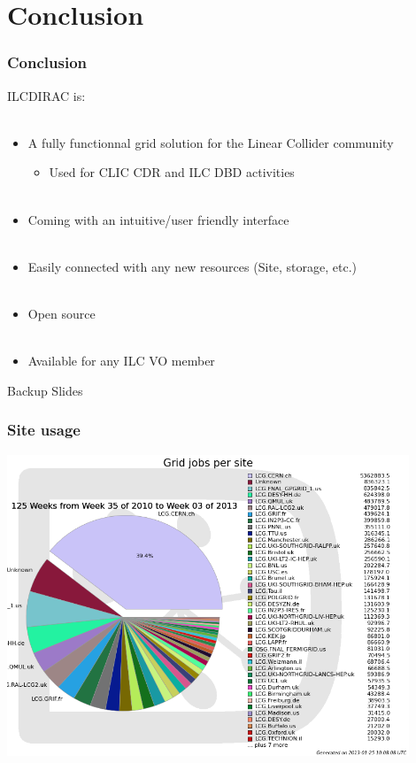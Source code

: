 \documentclass[10pt,table,dvipsnames]{beamer}
\newcommand{\interstitial}[1]{\begin{frame}\begin{block}{}\centering\Huge{#1}\end{block} \end{frame}}
\newcommand{\backupslides}{\interstitial{Backup Slides}}
\begin{document}
\section{Conclusion}
\label{sec:conc}
\begin{frame}
  \frametitle{Conclusion}
ILCDIRAC is:\\
~\\
\begin{itemize}
\item A \alert{fully functionnal grid solution} for the Linear Collider
  community
  \begin{itemize}
  \item Used for {\color{ForestGreen}CLIC CDR} and {\color{ForestGreen}ILC DBD} activities\\~\\
  \end{itemize}
\item Coming with an {\color{NavyBlue}intuitive/user friendly} interface\\
~\\
\item {\color{NavyBlue}Easily connected with any new resources} (Site, storage,
  etc.)\\
~\\
\item {\color{NavyBlue}Open source}\\
~\\
\item {\color{NavyBlue}Available} for any ILC VO member
\end{itemize}
\label{lastframe}
\end{frame}

\backupslides

\begin{frame}
  \frametitle{Site usage}
\centering
\includegraphics[width=0.9\textwidth]{PilotsPerSite}\\
\end{frame}
\end{document}
